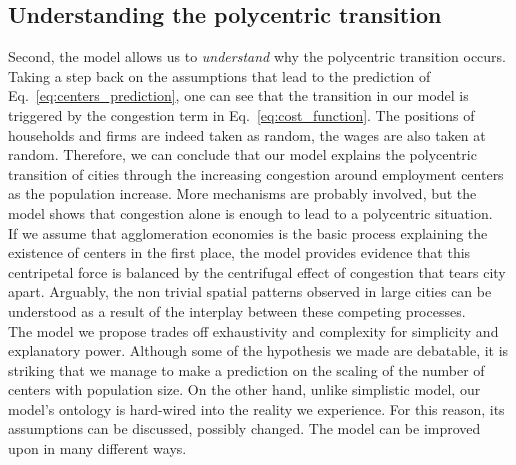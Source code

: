 \subsection{Understanding the polycentric transition}
\label{sub:understanding_the_polycentric_tranistion}

Second, the model allows us to \emph{understand} why the polycentric transition
occurs. Taking a step back on the assumptions that lead to the prediction of
Eq.~\ref{eq:centers_prediction}, one can see that the transition
in our model is triggered by the congestion term in Eq.~\ref{eq:cost_function}. The positions
of households and firms are indeed taken as random, the wages are also taken at
random. Therefore, we can conclude that our model explains the polycentric
transition of cities through the increasing congestion around employment centers
as the population increase. More mechanisms are probably involved, but the model
shows that congestion alone is enough to lead to a polycentric situation.\\

If we assume that agglomeration economies is the basic process explaining the
existence of centers in the first place, the model provides evidence that this
centripetal force is balanced by the centrifugal effect of congestion that
tears city apart. Arguably, the non trivial spatial patterns observed in large cities can
 be understood as a result of the interplay between these competing
processes.\\

The model we propose trades off exhaustivity and complexity for simplicity and
explanatory power. Although some of the hypothesis we made are debatable, it is
striking that we manage to make a prediction on the scaling of the number of
centers with population size. On the other hand, unlike simplistic model, our
model's ontology is hard-wired into the reality we experience. For this reason,
its assumptions can be discussed, possibly changed. The model can be improved
upon in many different ways.
